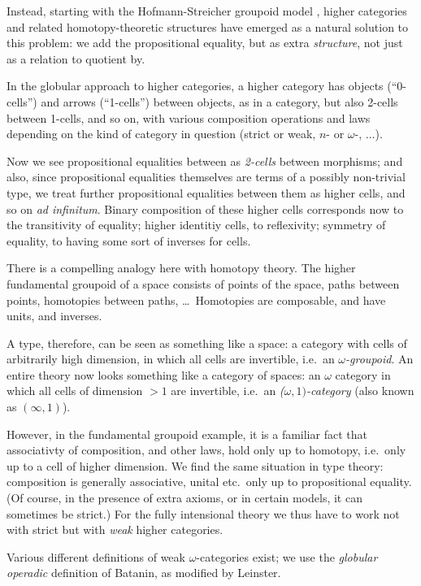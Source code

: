 \begin{para}Instead, starting with the Hofmann-Streicher groupoid model \cite{hofmann-streicher}, higher categories and related homotopy-theoretic structures have emerged as a natural solution to this problem: we add the propositional equality, but as extra \emph{structure}, not just as a relation to quotient by.

In the globular approach to higher categories, a higher category has objects (``0-cells'') and arrows (``1-cells'') between objects, as in a category, but also 2-cells between 1-cells, and so on, with various composition operations and laws depending on the kind of category in question (strict or weak, $n$- or $\omega$-, $\ldots$).

Now we see propositional equalities between as \emph{2-cells} between morphisms; and also, since propositional equalities themselves are terms of a possibly non-trivial type, we treat further propositional equalities between them as higher cells, and so on \emph{ad infinitum}.  Binary composition of these higher cells corresponds now to the transitivity of equality; higher identitiy cells, to reflexivity; symmetry of equality, to having some sort of inverses for cells.

There is a compelling analogy here with homotopy theory.  The higher fundamental groupoid of a space consists of points of the space, paths between points, homotopies between paths, \ldots\ Homotopies are composable, and have units, and inverses.

A type, therefore, can be seen as something like a space: a category with cells of arbitrarily high dimension, in which all cells are invertible, i.e.\ an \emph{$\omega$-groupoid}.  An entire theory now looks something like a category of spaces: an $\omega$ category in which all cells of dimension $> 1$ are invertible, i.e.\ an \emph{($\omega,1)$-category} (also known as $(\infty,1)$).

However, in the fundamental groupoid example, it is a familiar fact that associativty of composition, and other laws, hold only up to homotopy, i.e.\ only up to a cell of higher dimension.  We find the same situation in type theory: composition is generally associative, unital etc.\ only up to propositional equality.  (Of course, in the presence of extra axioms, or in certain models, it can sometimes be strict.)  For the fully intensional theory we thus have to work not with strict but with \emph{weak} higher categories.

Various different definitions of weak $\omega$-categories exist; we use the \emph{globular operadic} definition of Batanin, as modified by Leinster. 
\end{para}

